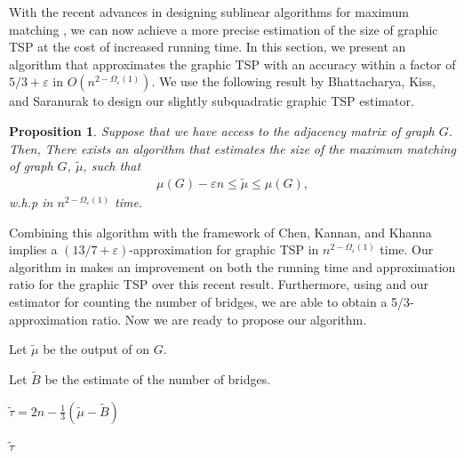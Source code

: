 \documentclass[letterpaper,11pt]{article}
\renewcommand{\epsilon}{\varepsilon}
\newtheorem{proposition}[theorem]{Proposition}
\begin{document}
With the recent advances in designing sublinear algorithms for maximum matching \cite{ behnezhadroghanirubinstein2022, BehnezhadRRS-ArXiv22, sayanSublinear2022, bhattacharya2023dynamic}, we can now achieve a more precise estimation of the size of graphic TSP at the cost of increased running time. In this section, we present an algorithm that approximates the graphic TSP with an accuracy within a factor of $5/3 + \epsilon$ in $O(n^{2-\Omega_\epsilon(1)})$. We use the following result by Bhattacharya, Kiss, and Saranurak \cite{bhattacharya2023dynamic} to design our slightly subquadratic graphic TSP estimator.

\begin{proposition}\label{prop:matching-estimator}
    Suppose that we have access to the adjacency matrix of graph $G$. Then, There exists an algorithm that estimates the size of the maximum matching of graph $G$, $\tilde \mu$, such that
    \begin{align*}
        \mu(G) - \epsilon n \leq \tilde \mu \leq \mu(G),
    \end{align*}
    w.h.p in $n^{2-\Omega_\epsilon(1)}$ time.
\end{proposition}

Combining this algorithm with the framework of Chen, Kannan, and Khanna \cite{chen2020} implies a $(13/7+\epsilon)$-approximation for graphic TSP in $n^{2-\Omega_\epsilon(1)}$ time. Our algorithm in  makes an improvement on both the running time and approximation ratio for the graphic TSP over this recent result. Furthermore, using  and our estimator for counting the number of bridges, we are able to obtain a 5/3-approximation ratio. Now we are ready to propose our algorithm.


\begin{algorithm}
\caption{Slightly subquadratic algorithm for graphic TSP.}
\label{alg: graphic-tsp3}
    
    Let $\tilde{\mu}$ be the output of  on $G$.
    
    Let $\tilde{B}$ be the estimate of the number of bridges. 
    
    $\tilde{\tau} = 2n - \frac{1}{3}(\tilde{\mu} - \tilde{B})$
    
    \Return $\tilde{\tau}$
\end{algorithm}
\end{document}
